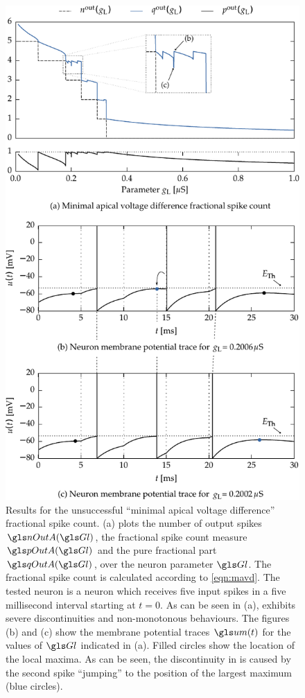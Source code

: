 \begin{figure}
	\centering
	\includegraphics{media/chp4/min_apices_problems.pdf}
	\caption[Unsuccessful fractional spike count calculation strategy]{Results for the unsuccessful \enquote{minimal apical voltage difference} fractional spike count. (a) plots the number of output spikes $\nOutA(\Gl)$, the fractional spike count measure $\pOutA(\Gl)$ and the pure fractional part $\qOutA(\Gl)$, over the neuron parameter $\Gl$. The fractional spike count is calculated according to \cref{eqn:mavd}. The tested neuron is a \LIF neuron which receives five input spikes in a five millisecond interval starting at $t = 0$. As can be seen in (a), \pOutA exhibits severe discontinuities and non-monotonous behaviours. The figures (b) and (c) show the membrane potential traces $\um(t)$ for the values of $\Gl$ indicated in (a). Filled circles show the location of the local maxima. As can be seen, the discontinuity in \pOutA is caused by the second spike \enquote{jumping} to the position of the largest maximum (blue circles).}
	\label{fig:qout_unsuccessful}
\end{figure}
